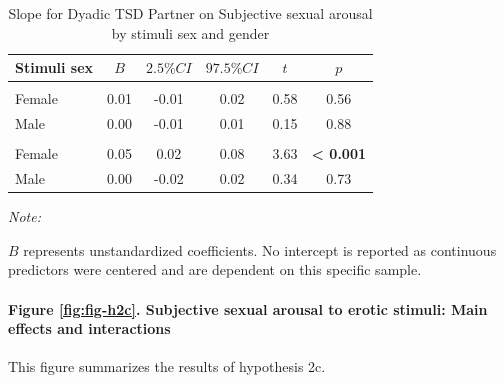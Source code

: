 \documentclass[
  bookmarksnumbered]{article}
\begin{document}
\begin{table}[H]
\centering
\caption{\label{tab:unnamed-chunk-25}Slope for Dyadic TSD Partner on Subjective sexual arousal by
    stimuli sex and gender}
\centering
\begin{threeparttable}
\begin{tabular}[t]{lccccc}
\toprule
Stimuli sex & $B$ & $2.5\% CI$ & $97.5\% CI$ & $t$ & $p$\\
\midrule
\addlinespace[0.3em]
\multicolumn{6}{l}{\cellcolor{lightgray}{Gender: Women}}\\
\hspace{1em}Female & 0.01 & -0.01 & 0.02 & 0.58 & 0.56\\
\hspace{1em}Male & 0.00 & -0.01 & 0.01 & 0.15 & 0.88\\
\addlinespace[0.3em]
\multicolumn{6}{l}{\cellcolor{lightgray}{Gender: Men}}\\
\hspace{1em}Female & 0.05 & 0.02 & 0.08 & 3.63 & \textbf{< 0.001}\\
\hspace{1em}Male & 0.00 & -0.02 & 0.02 & 0.34 & 0.73\\
\bottomrule
\end{tabular}
\begin{tablenotes}[para]
\item \textit{Note: } 
\item $B$ represents unstandardized coefficients. No intercept is reported as
    continuous predictors were centered and are dependent on this specific sample.
\end{tablenotes}
\end{threeparttable}
\end{table}

\paragraph{Figure \ref{fig:fig-h2c}. Subjective sexual arousal to erotic stimuli: Main effects and interactions}\label{figure-reffigfig-h2c.-subjective-sexual-arousal-to-erotic-stimuli-main-effects-and-interactions}

This figure summarizes the results of hypothesis 2c.
\end{document}
